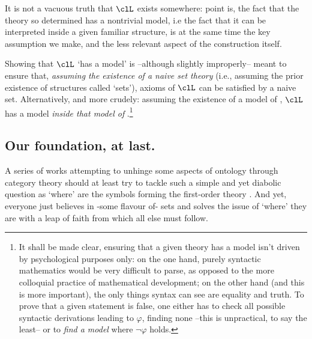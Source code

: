 It is not a vacuous truth that $\clL$ exists somewhere: point is, the fact that the theory so determined has a nontrivial model, i.e the fact that it can be interpreted inside a given familiar structure, is at the same time the key assumption we make, and the less relevant aspect of the construction itself.

Showing that $\clL$ `has a model' is --although slightly improperly-- meant to ensure that, \emph{assuming the existence of a naive set theory} (i.e., assuming the prior existence of structures called `sets'), axioms of $\clL$ can be satisfied by a naive set. Alternatively, and more crudely: assuming the existence of a model of , $\clL$ has a model \emph{inside that model of }.\footnote{It shall be made clear, ensuring that a given theory has a model isn't driven by psychological purposes only: on the one hand, purely syntactic mathematics would be very difficult to parse, as opposed to the more colloquial practice of mathematical development; on the other hand (and this is more important), the only things syntax can see are equality and truth. To prove that a given statement is false, one either has to check all possible syntactic derivations leading to $\varphi$, finding none --this is unpractical, to say the least-- or to \emph{find a model} where $\lnot\varphi$ holds.}

\subsection{Our foundation, at last.} A series of works attempting to unhinge some aspects of ontology through category theory should at least try to tackle such a simple and yet diabolic question as `where' are the symbols forming the first-order theory . And yet, everyone just believes in -some flavour of- sets and solves the issue of `where' they are with a leap of faith from which all else must follow.

